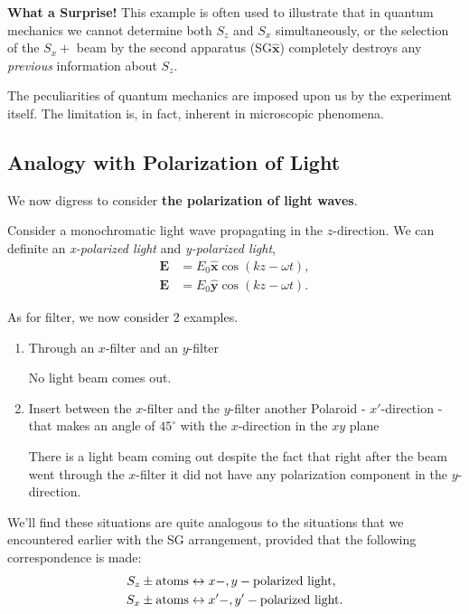 \documentclass[11pt]{elegantbook}
\begin{document}
\textbf{What a Surprise!} This example is often used to illustrate that in quantum mechanics we 
cannot determine both $S_z$ and $S_x$ simultaneously, or the selection of the $S_x+$ beam 
by the second apparatus (SG$\hat{\bm{x}}$) completely destroys any \textit{previous} 
information about $S_z$.

The peculiarities of quantum mechanics are imposed upon us by the experiment itself. 
The limitation is, in fact, inherent in microscopic phenomena.

\subsection{Analogy with Polarization of Light}

We now digress to consider \textbf{the polarization of light waves}.

Consider a monochromatic light wave propagating in the $z$-direction. We can definite an 
\textit{x-polarized light} and \textit{y-polarized light}, 
\begin{align}
  \bm{E}&=E_0\hat{\bm{x}}\cos(kz-\omega t),\\
  \bm{E}&=E_0\hat{\bm{y}}\cos(kz-\omega t).
\end{align}

As for filter, we now consider 2 examples.
\begin{enumerate}
  \item Through an $x$-filter and an $y$-filter 
  
  No light beam comes out.
  \item Insert between the $x$-filter and the $y$-filter another Polaroid - $x'$-direction - 
  that makes an angle of $45^\circ$ with the $x$-direction in the $xy$ plane 

  There is a light beam coming out despite the fact that right after the beam went through the $x$-filter 
  it did not have any polarization component in the $y$-direction.
\end{enumerate}
We'll find these situations are quite analogous to the situations that we encountered 
earlier with the SG arrangement, provided that the following correspondence is made: 
\begin{align}
  \begin{split}
    S_z\pm\rm{atoms}&\leftrightarrow x-,y-\rm{polarized\ light},\\
    S_x\pm\rm{atoms}&\leftrightarrow x'-,y'-\rm{polarized\ light}.
  \end{split}
\end{align}
\end{document}
